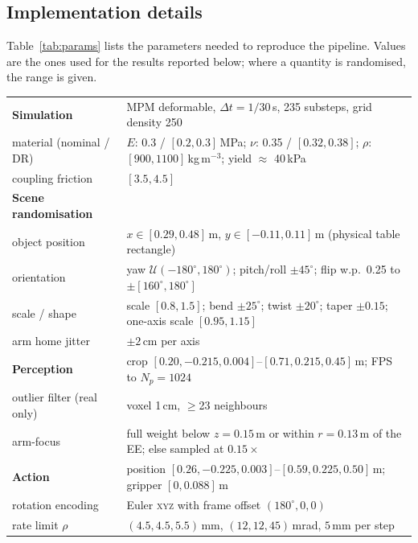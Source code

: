 \subsection{Implementation details}
\label{sec:method:impl}

Table~\ref{tab:params} lists the parameters needed to reproduce the pipeline. Values are the
ones used for the results reported below; where a quantity is randomised, the range is given.

\begin{table}[t]
\centering\small
\begin{tabular}{ll}
\toprule
\textbf{Simulation} & MPM deformable, $\Delta t = 1/30$\,s, 235 substeps, grid density 250 \\
\quad material (nominal / DR) & $E$: 0.3 / $[0.2,0.3]$\,MPa; $\nu$: 0.35 / $[0.32,0.38]$;
                                $\rho$: $[900,1100]$\,kg\,m$^{-3}$; yield $\approx$ 40\,kPa \\
\quad coupling friction & $[3.5, 4.5]$ \\
\midrule
\textbf{Scene randomisation} & \\
\quad object position & $x\!\in\![0.29,0.48]$\,m, $y\!\in\![-0.11,0.11]$\,m (physical table rectangle) \\
\quad orientation & yaw $\mathcal{U}(-180^\circ,180^\circ)$; pitch/roll $\pm45^\circ$;
                    flip w.p.\ 0.25 to $\pm[160^\circ,180^\circ]$ \\
\quad scale / shape & scale $[0.8,1.5]$; bend $\pm25^\circ$; twist $\pm20^\circ$;
                      taper $\pm0.15$; one-axis scale $[0.95,1.15]$ \\
\quad arm home jitter & $\pm2$\,cm per axis \\
\midrule
\textbf{Perception} & crop $[0.20,-0.215,0.004]$--$[0.71,0.215,0.45]$\,m; FPS to $N_p\!=\!1024$ \\
\quad outlier filter (real only) & voxel 1\,cm, $\ge$23 neighbours \\
\quad arm-focus & full weight below $z\!=\!0.15$\,m or within $r\!=\!0.13$\,m of the EE;
                  else sampled at $0.15\times$ \\
\midrule
\textbf{Action} & position $[0.26,-0.225,0.003]$--$[0.59,0.225,0.50]$\,m; gripper $[0,0.088]$\,m \\
\quad rotation encoding & Euler \textsc{xyz} with frame offset $(180^\circ,0,0)$ \\
\quad rate limit $\rho$ & $(4.5, 4.5, 5.5)$\,mm, $(12, 12, 45)$\,mrad, $5$\,mm per step \\

\end{tabular}
\end{table}
